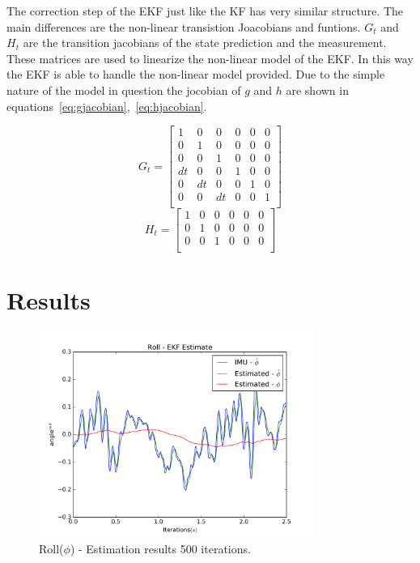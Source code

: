 \documentclass[letter]{IEEEtran}
\begin{document}
The correction step of the EKF just like the KF has very similar structure. The main differences are the non-linear transistion Joacobians and funtions. $G_t$ and $H_t$ are the transition jacobians of the state prediction and the measurement. These matrices are used to linearize the non-linear model of the EKF. In this way the EKF is able to handle the non-linear model provided. Due to the simple nature of the model in question the jocobian of $g$ and $h$ are shown in equations~\ref{eq:gjacobian},~\ref{eq:hjacobian}.

\begin{equation}
\label{eq:gjacobian}
G_t = 
\begin{bmatrix}
1 & 0 & 0 & 0 & 0 & 0 \\
0 & 1 & 0 & 0 & 0 & 0 \\
0 & 0 & 1 & 0 & 0 & 0 \\
dt& 0 & 0 & 1 & 0 & 0 \\
0 & dt& 0 & 0 & 1 & 0 \\
0 & 0 & dt& 0 & 0 & 1 \\
\end{bmatrix}
\end{equation}
\begin{equation}
\label{eq:hjacobian}
H_t = 
\begin{bmatrix}
1 & 0 & 0 & 0 & 0 & 0 \\
0 & 1 & 0 & 0 & 0 & 0 \\
0 & 0 & 1 & 0 & 0 & 0 \\
\end{bmatrix}
\end{equation}

\section{Results}
\begin{figure}
\centering
\includegraphics[width=9cm]{roll-result-500-s}
\caption{Roll($\phi$) - Estimation results 500 iterations.}
\label{fig:result-500-roll}
\end{figure}
\end{document}
